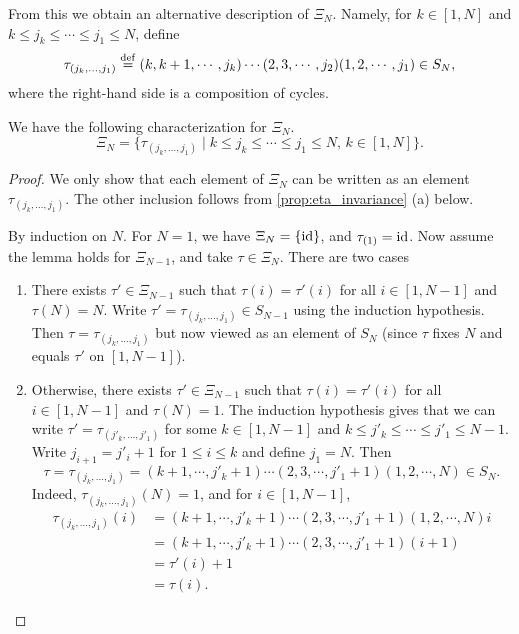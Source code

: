 From this we obtain an alternative description of $\Xi_N$. Namely, for $k\in [1, N]$
and $k \leq j_k \leq \cdots \leq j_1 \leq N$, define
\begin{equation*}
	\tau_{(j_k, \dots, j_1)} \overset{\mathrm{def}}{=} (k,k+1, \cdots, j_k)\cdots (2,3, \cdots, j_2)(1,2,\cdots, j_1)\in S_N,
\end{equation*}
%
where the right-hand side is a composition of cycles.
\begin{lemma}
	We have the following characterization for $\Xi_N$.
	\begin{equation*}
		\Xi_N = \{\tau_{(j_k, \dots, j_1)} \mid k \leq j_k \leq \cdots \leq j_1 \leq N,\, k\in [1, N]\}.
	\end{equation*}
\end{lemma}
\begin{proof}
	We only show that each element of $\Xi_N$ can be written as an element $\tau_{(j_k, \dots, j_1)}$. The other inclusion follows from \cref{prop:eta_invariance} (a) below.

	By induction on $N$. For $N = 1$, we have $\Xi_N = \{\operatorname{id}\}$, and $\tau_{(1)} = \operatorname{id}$. Now assume the lemma holds for $\Xi_{N-1}$, and take $\tau \in \Xi_N$. There are two cases
	\begin{enumerate}
		\item There exists $\tau' \in \Xi_{N-1}$ such that $\tau(i) = \tau'(i)$ for all $i\in [1,
				      N-1]$ and $\tau(N) = N$. Write $\tau' = \tau_{(j_k, \dots, j_1)} \in S_{N-1}$ using the
		      induction hypothesis. Then $\tau = \tau_{(j_k, \dots, j_1)}$ but now viewed as an
		      element of $S_N$ (since $\tau$ fixes $N$ and equals $\tau'$ on $[1, N-1]$).
		\item Otherwise, there exists $\tau' \in \Xi_{N-1}$ such that $\tau(i) = \tau'(i)$ for all
		      $i\in [1, N-1]$ and $\tau(N) = 1$. The induction hypothesis gives that we can write
		      $\tau' = \tau_{(j'_k, \dots, j'_1)}$ for some $k \in [1, N - 1]$ and $k \leq j'_k \leq
			      \cdots \leq j'_1 \leq N - 1$. Write $j_{i+1} = j'_i + 1$ for $1 \leq i \leq k$ and
		      define $j_1 = N$. Then
		      \begin{equation*}
			      \tau = \tau_{(j_k, \dots, j_1)} = (k+1, \cdots, j'_k + 1) \cdots (2, 3, \cdots ,j'_1 + 1)(1,2, \cdots, N) \in S_N.
		      \end{equation*}
		      Indeed, $\tau_{(j_k, \dots, j_1)}(N) = 1$, and for $i \in [1, N-1]$,
		      \begin{align*}
			      \tau_{(j_k, \dots, j_1)}(i)
			       & = (k+1, \cdots, j'_k + 1) \cdots (2, 3, \cdots, j'_1 + 1)(1,2, \cdots, N) i \\
			       & = (k+1, \cdots, j'_k + 1) \cdots (2, 3, \cdots, j'_1 + 1) (i+1)             \\
			       & = \tau'(i) + 1                                                              \\
			       & = \tau(i).
		      \end{align*}
	\end{enumerate}
\end{proof}

